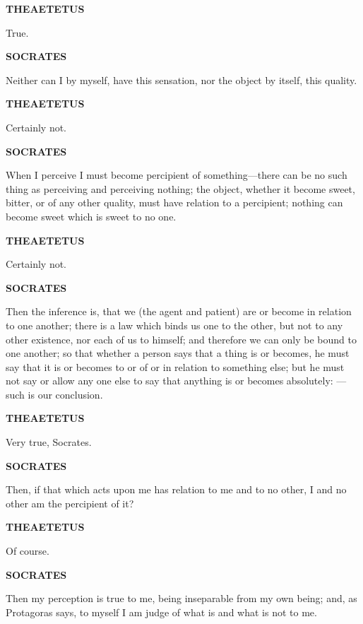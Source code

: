 \documentclass[11pt,letter]{article}
\begin{document}
\par \textbf{THEAETETUS}
\par   True.

\par \textbf{SOCRATES}
\par   Neither can I by myself, have this sensation, nor the object by itself, this quality.

\par \textbf{THEAETETUS}
\par   Certainly not.

\par \textbf{SOCRATES}
\par   When I perceive I must become percipient of something—there can be no such thing as perceiving and perceiving nothing; the object, whether it become sweet, bitter, or of any other quality, must have relation to a percipient; nothing can become sweet which is sweet to no one.

\par \textbf{THEAETETUS}
\par   Certainly not.

\par \textbf{SOCRATES}
\par   Then the inference is, that we (the agent and patient) are or become in relation to one another; there is a law which binds us one to the other, but not to any other existence, nor each of us to himself; and therefore we can only be bound to one another; so that whether a person says that a thing is or becomes, he must say that it is or becomes to or of or in relation to something else; but he must not say or allow any one else to say that anything is or becomes absolutely: —such is our conclusion.

\par \textbf{THEAETETUS}
\par   Very true, Socrates.

\par \textbf{SOCRATES}
\par   Then, if that which acts upon me has relation to me and to no other, I and no other am the percipient of it?

\par \textbf{THEAETETUS}
\par   Of course.

\par \textbf{SOCRATES}
\par   Then my perception is true to me, being inseparable from my own being; and, as Protagoras says, to myself I am judge of what is and what is not to me.
\end{document}

